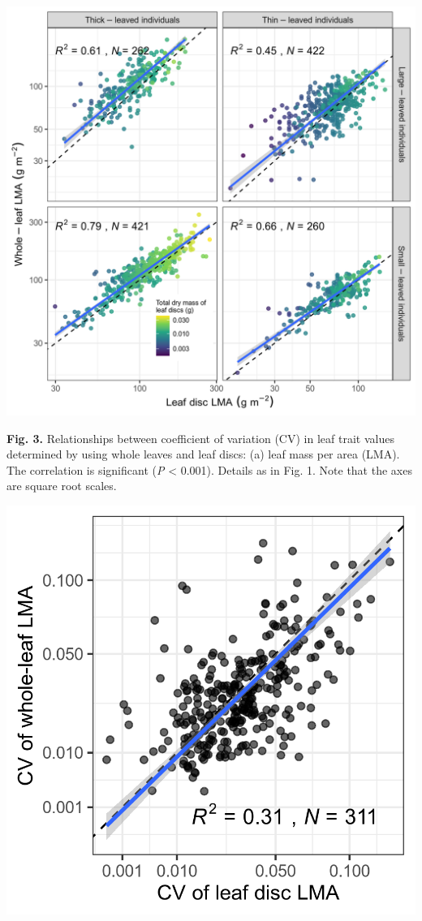 \documentclass[
  12pt,
  a4paper,
,tablecaptionabove
]{scrartcl}
\begin{document}
\includegraphics{../figs/lalt_tree_grid.png}

\newpage

\textbf{Fig. 3.} Relationships between coefficient of variation (CV) in
leaf trait values determined by using whole leaves and leaf discs: (a)
leaf mass per area (LMA). The correlation is significant (\emph{P}
\textless{} 0.001). Details as in Fig. 1. Note that the axes are square
root scales.

\includegraphics{../figs/cv_pool.png}
\end{document}
